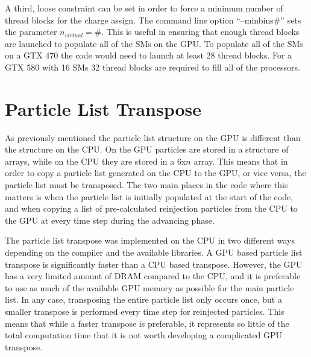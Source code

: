 A third, loose constraint can be set in order to force a minimum number of thread blocks for the charge assign. The command line option ``--minbins\#'' sets the parameter $n_{virtual} = \#$. This is useful in ensuring that enough thread blocks are launched to populate all of the SMs on the GPU. To populate all of the SMs on a GTX 470 the code would need to launch at least 28 thread blocks. For a GTX 580 with 16 SMs 32 thread blocks are required to fill all of the processors.  

	\section{Particle List Transpose}
As previously mentioned the particle list structure on the GPU is different than the structure on the CPU. On the GPU particles are stored in a structure of arrays, while on the CPU they are stored in a 6x$n$ array. This means that in order to copy a particle list generated on the CPU to the GPU, or vice versa, the particle list must be transposed. The two main places in the code where this matters is when the particle list is initially populated at the start of the code, and when copying a list of pre-calculated reinjection particles from the CPU to the GPU at every time step during the advancing phase.

The particle list transpose was implemented on the CPU in two different ways depending on the compiler and the available libraries. A GPU based particle list transpose is significantly faster than a CPU based transpose. However, the GPU has a very limited amount of DRAM compared to the CPU, and it is preferable to use as much of the available GPU memory as possible for the main particle list. In any case, transposing the entire particle list only occurs once, but a smaller transpose is performed every time step for reinjected particles. This means that while a faster transpose is preferable, it represents so little of the total computation time that it is not worth developing a complicated GPU transpose.  

